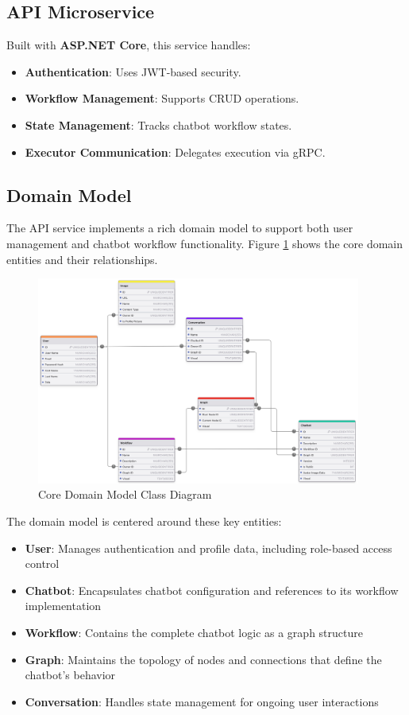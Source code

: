 \subsection{API Microservice}
Built with \textbf{ASP.NET Core}, this service handles:
\begin{itemize}
\item \textbf{Authentication}: Uses JWT-based security.
\item \textbf{Workflow Management}: Supports CRUD operations.
\item \textbf{State Management}: Tracks chatbot workflow states.
\item \textbf{Executor Communication}: Delegates execution via gRPC.
\end{itemize}

\subsection{Domain Model}
The API service implements a rich domain model to support both user management and chatbot workflow functionality. Figure \ref{fig:system_uml} shows the core domain entities and their relationships.

\begin{figure}[H]
    \centering
    \includegraphics[width=0.95\textwidth]{assets/SystemUmlDiagram.png}
    \caption{Core Domain Model Class Diagram}
    \label{fig:system_uml}
\end{figure}

The domain model is centered around these key entities:
\begin{itemize}
    \item \textbf{User}: Manages authentication and profile data, including role-based access control
    \item \textbf{Chatbot}: Encapsulates chatbot configuration and references to its workflow implementation
    \item \textbf{Workflow}: Contains the complete chatbot logic as a graph structure
    \item \textbf{Graph}: Maintains the topology of nodes and connections that define the chatbot's behavior
    \item \textbf{Conversation}: Handles state management for ongoing user interactions
\end{itemize}

